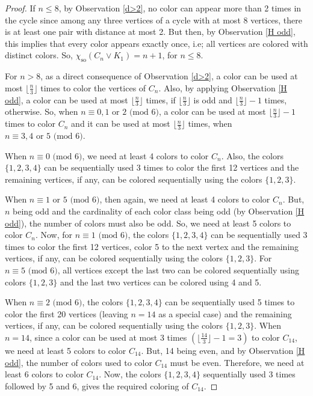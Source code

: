 \documentclass[12pt,a4paper]{article}
\theoremstyle{definition}
\numberwithin{equation}{section}
\begin{document}
\begin{proof}
If $n \leq 8$, by Observation \ref{d>2}, no color can appear more than 2 times in the cycle since among any three vertices of a cycle with at most 8 vertices, there is at least one pair with distance at most 2. But then, by Observation \ref{H odd}, this implies that every color appears exactly once, i.e; all vertices are colored with distinct colors. So, $\chi_{\text{so}}(C_n \vee K_1) = n+1$, for $ n\leq 8$. \par
For $n>8$, as a direct consequence of Observation \ref{d>2}, a color can be used at most $\lfloor \frac{n}{3} \rfloor$ times to color the vertices of $C_n$. Also, by applying Observation \ref{H odd}, a color can be used at most $\lfloor \frac{n}{3} \rfloor$ times, if $\lfloor \frac{n}{3} \rfloor$ is odd and $\lfloor \frac{n}{3} \rfloor - 1$ times, otherwise. So, when $n \equiv 0,1 \text{ or } 2\text{ (mod 6)}$, a color can be used at most $\lfloor \frac{n}{3} \rfloor - 1$ times to color $C_n$ and it can be used at most $\lfloor \frac{n}{3} \rfloor$ times, when $n \equiv 3,4 \text{ or } 5 \text{ (mod 6)}$.\par

When $n \equiv 0 \text{ (mod 6)}$, we need at least 4 colors to color $C_n$. Also, the colors $\{1,2,3,4\}$ can be sequentially used 3 times to color the first 12 vertices and the remaining vertices, if any, can be colored sequentially using the colors $\{1,2,3\}$.\par

When $n \equiv 1 \text{ or }5 \text{ (mod 6)}$, then again, we need at least 4 colors to color $C_n$. But, $n$ being odd and the cardinality of each color class being odd (by Observation \ref{H odd}), the number of colors must also be odd. So, we need at least 5 colors to color $C_n$. Now, for $n \equiv 1 \text{ (mod 6)}$, the colors $\{1,2,3,4\}$ can be sequentially used 3 times to color the first 12 vertices, color 5 to the next vertex and the remaining vertices, if any, can be colored sequentially using the colors $\{1,2,3\}$. For $n \equiv 5 \text{ (mod 6)}$, all vertices except the last two can be colored sequentially using colors $\{1,2,3\}$ and the last two vertices can be colored using 4 and 5.\par

When $n \equiv 2 \text{ (mod 6)}$,  the colors $\{1,2,3,4\}$ can be sequentially used 5 times to color the first 20 vertices (leaving $n=14$ as a special case) and the remaining vertices, if any, can be colored sequentially using the colors $\{1,2,3\}$. When $n=14$, since a color can be used at most 3 times $(
\lfloor\frac{14}{3}\rfloor - 1 = 3)$ to color $C_{14}$, we need at least 5 colors to color $C_{14}$. But, 14 being even, and by Observation \ref{H odd}, the number of colors used to color $C_{14}$ must be even. Therefore, we need at least 6 colors to color $C_{14}$. Now, the colors $\{1,2,3,4\}$ sequentially used 3 times followed by 5 and 6, gives the required coloring of $C_{14}$. \par


\end{proof}
\end{document}
